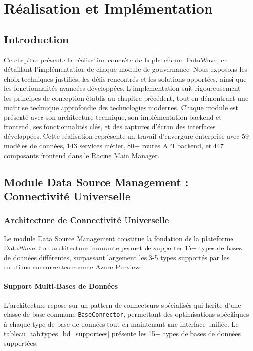 ﻿\chapter{Réalisation et Implémentation}

\section*{Introduction}

Ce chapitre présente la réalisation concrète de la plateforme DataWave, en détaillant l'implémentation de chaque module de gouvernance. Nous exposons les choix techniques justifiés, les défis rencontrés et les solutions apportées, ainsi que les fonctionnalités avancées développées. L'implémentation suit rigoureusement les principes de conception établis au chapitre précédent, tout en démontrant une maîtrise technique approfondie des technologies modernes. Chaque module est présenté avec son architecture technique, son implémentation backend et frontend, ses fonctionnalités clés, et des captures d'écran des interfaces développées. Cette réalisation représente un travail d'envergure enterprise avec 59 modèles de données, 143 services métier, 80+ routes API backend, et 447 composants frontend dans le Racine Main Manager.

\section{Module Data Source Management : Connectivité Universelle}

\subsection{Architecture de Connectivité Universelle}

Le module Data Source Management constitue la fondation de la plateforme DataWave. Son architecture innovante permet de supporter 15+ types de bases de données différentes, surpassant largement les 3-5 types supportés par les solutions concurrentes comme Azure Purview.

\subsubsection{Support Multi-Bases de Données}

L'architecture repose sur un pattern de connecteurs spécialisés qui hérite d'une classe de base commune \texttt{BaseConnector}, permettant des optimisations spécifiques à chaque type de base de données tout en maintenant une interface unifiée. Le tableau \ref{tab:types_bd_supportees} présente les 15+ types de bases de données supportées.

